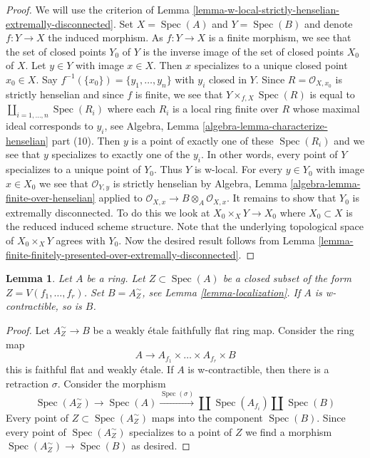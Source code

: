 \documentclass{stacks-project}
\theoremstyle{plain}
\newtheorem{lemma}[subsection]{Lemma}
\theoremstyle{definition}
\theoremstyle{remark}
\numberwithin{equation}{subsection}
\def\Spec{\mathop{\mathrm{Spec}}}
\begin{document}
\begin{proof}
We will use the criterion of
Lemma \ref{lemma-w-local-strictly-henselian-extremally-disconnected}.
Set $X = \Spec(A)$ and $Y = \Spec(B)$ and denote $f : Y \to X$
the induced morphism.
As $f : Y \to X$ is a finite morphism, we see that the set of closed
points $Y_0$ of $Y$ is the inverse image of the set of closed points
$X_0$ of $X$. Let $y \in Y$ with image $x \in X$. Then
$x$ specializes to a unique closed point $x_0 \in X$.
Say $f^{-1}(\{x_0\}) = \{y_1, \ldots, y_n\}$ with $y_i$
closed in $Y$. Since $R = \mathcal{O}_{X, x_0}$ is strictly henselian
and since $f$ is finite, we see that $Y \times_{f, X} \Spec(R)$ is
equal to $\coprod_{i = 1, \ldots, n} \Spec(R_i)$ where
each $R_i$ is a local ring finite over $R$
whose maximal ideal corresponds to $y_i$, see
Algebra, Lemma \ref{algebra-lemma-characterize-henselian} part (10).
Then $y$ is a point of exactly one of these $\Spec(R_i)$
and we see that $y$ specializes to exactly one of the $y_i$.
In other words, every point of $Y$ specializes to a unique
point of $Y_0$. Thus $Y$ is w-local.
For every $y \in Y_0$ with image $x \in X_0$
we see that $\mathcal{O}_{Y, y}$ is strictly henselian by
Algebra, Lemma \ref{algebra-lemma-finite-over-henselian}
applied to $\mathcal{O}_{X, x} \to B \otimes_A \mathcal{O}_{X, x}$.
It remains to show that $Y_0$ is extremally disconnected.
To do this we look at $X_0 \times_X Y \to X_0$
where $X_0 \subset X$ is the reduced induced scheme structure.
Note that the underlying topological space of
$X_0 \times_X Y$ agrees with $Y_0$. Now the desired result follows from
Lemma \ref{lemma-finite-finitely-presented-over-extremally-disconnected}.
\end{proof}

\begin{lemma}
\label{lemma-localization-w-contractible}
Let $A$ be a ring. Let $Z \subset \Spec(A)$ be a closed subset
of the form $Z = V(f_1, \ldots, f_r)$. Set $B = A_Z^\sim$, see
Lemma \ref{lemma-localization}. If $A$ is w-contractible, so is $B$.
\end{lemma}

\begin{proof}
Let $A_Z^\sim \to B$ be a weakly \'etale faithfully flat ring map.
Consider the ring map
$$
A \longrightarrow A_{f_1} \times \ldots \times A_{f_r} \times B
$$
this is faithful flat and weakly \'etale. If $A$ is w-contractible,
then there is a retraction $\sigma$. Consider the morphism
$$
\Spec(A_Z^\sim) \to \Spec(A) \xrightarrow{\Spec(\sigma)}
\coprod \Spec(A_{f_i}) \amalg \Spec(B)
$$
Every point of $Z \subset \Spec(A_Z^\sim)$ maps into the component
$\Spec(B)$. Since every point of $\Spec(A_Z^\sim)$ specializes to a
point of $Z$ we find a morphism $\Spec(A_Z^\sim) \to \Spec(B)$
as desired.
\end{proof}
\end{document}
